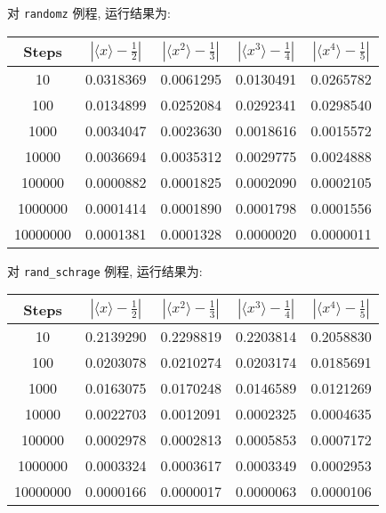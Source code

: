 对 \verb|randomz| 例程, 运行结果为:
\begin{center}
\begin{tabular}{c|c|c|c|c}\hline
Steps&$|\langle x\rangle - \frac{1}{2}|$&$|\langle x^2\rangle- \frac{1}{3}|$&$|\langle x^3\rangle- \frac{1}{4}|$&$|\langle x^4\rangle- \frac{1}{5}|$\\\hline
10& 0.0318369& 0.0061295& 0.0130491& 0.0265782\\\hline
100& 0.0134899& 0.0252084& 0.0292341& 0.0298540\\\hline
1000& 0.0034047& 0.0023630& 0.0018616& 0.0015572\\\hline
10000& 0.0036694& 0.0035312& 0.0029775& 0.0024888\\\hline
100000& 0.0000882& 0.0001825& 0.0002090& 0.0002105\\\hline
1000000& 0.0001414& 0.0001890& 0.0001798& 0.0001556\\\hline
10000000& 0.0001381& 0.0001328& 0.0000020& 0.0000011\\\hline
\end{tabular}
\end{center}
对 \verb|rand_schrage| 例程, 运行结果为:
\begin{center}
\begin{tabular}{c|c|c|c|c}\hline
Steps&$|\langle x\rangle - \frac{1}{2}|$&$|\langle x^2\rangle- \frac{1}{3}|$&$|\langle x^3\rangle- \frac{1}{4}|$&$|\langle x^4\rangle- \frac{1}{5}|$\\\hline
10& 0.2139290& 0.2298819& 0.2203814& 0.2058830\\\hline
100& 0.0203078& 0.0210274& 0.0203174& 0.0185691\\\hline
1000& 0.0163075& 0.0170248& 0.0146589& 0.0121269\\\hline
10000& 0.0022703& 0.0012091& 0.0002325& 0.0004635\\\hline
100000& 0.0002978& 0.0002813& 0.0005853& 0.0007172\\\hline
1000000& 0.0003324& 0.0003617& 0.0003349& 0.0002953\\\hline
10000000& 0.0000166& 0.0000017& 0.0000063& 0.0000106\\\hline
\end{tabular}
\end{center}
